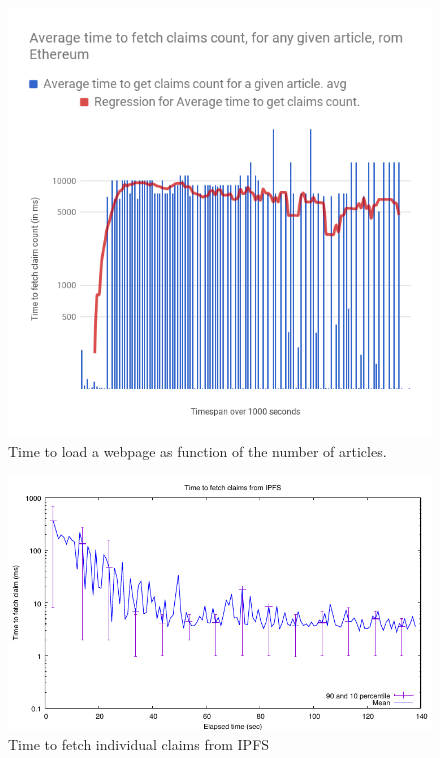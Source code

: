 \begin{figure}[t]
  \centering
  \includegraphics[width=\columnwidth]{mock-figures/ethereumfetch.png}
  \vspace{-10pt}
  \caption{Time to load a webpage as function of the number of articles. }
  \label{fig:ethereumfetch}
\end{figure}

\begin{figure}[t]
  \centering
  \includegraphics[width=\columnwidth]{mock-figures/ipfsfetch.pdf}
  \vspace{-10pt}
  \caption{Time to fetch individual claims from IPFS}
  \label{fig:ipfsfetch}
\end{figure}


